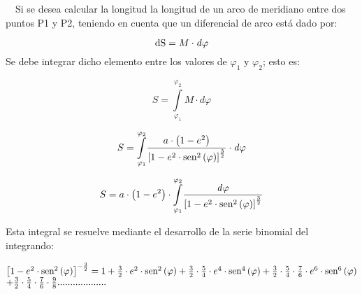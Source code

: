 \documentclass{tufte-book}
\newcommand\normalsubformula[1]{\text{\mathversion{normal}$#1$}}
\begin{document}
\ \ Si se desea calcular la longitud la longitud de un arco de meridiano
entre dos puntos P1 y P2, teniendo en cuenta que un diferencial de arco
está dado por:

\begin{equation*}
{\normalsubformula{\text{dS}}=M\cdot \mathit{d\varphi }}
\end{equation*}
Se debe integrar dicho elemento entre los valores de  ${\varphi _{{1}}}$
y  ${\varphi _{{2}}}$; esto es:

\begin{equation*}
{S=\overset{\varphi _{{2}}}{\underset{{\varphi _{{1}}}}{\int }}{M\cdot
\mathit{d\varphi }}}
\end{equation*}

\begin{equation*}
{S=\overset{\varphi _{{2}}}{\underset{{\varphi _{{1}}}}{\int}}{\frac{a\cdot \left(1-e^{{2}}\right)}{\left[1-e^{{2}}\cdot \normalsubformula{\text{sen}}^{{2}}\left(\varphi \right)\right]^{{\frac{3}{2}}}}\cdot \mathit{d\varphi }}}
\end{equation*}

\begin{equation*}
{S=a\cdot \left(1-e^{{2}}\right)\cdot \overset{\varphi _{{2}}}{\underset{{\varphi _{{1}}}}{\int }}{\frac{\mathit{d\varphi}}{\left[1-e^{{2}}\cdot \normalsubformula{\text{sen}}^{{2}}\left(\varphi \right)\right]^{{\frac{3}{2}}}}}}
\end{equation*}

Esta integral se resuelve mediante el desarrollo de la serie binomial
del integrando:

\begin{equation*}
\begin{matrix}{\left[1-e^{{2}}\cdot \normalsubformula{\text{sen}}^{{2}}\left(\varphi \right)\right]^{{-{\frac{3}{2}}}}=1+\frac{3}{2}\cdot e^{{2}}\cdot \normalsubformula{\text{sen}}^{{2}}\left(\varphi \right)+\frac{3}{2}\cdot {\frac{5}{4}}\cdot e^{{4}}\cdot \normalsubformula{\text{sen}}^{{4}}\left(\varphi \right)+\frac{3}{2}\cdot {\frac{5}{4}}\cdot {\frac{7}{6}}\cdot e^{{6}}\cdot \normalsubformula{\text{sen}}^{{6}}\left(\varphi \right)}\hfill\null \\+{\frac{3}{2}}\cdot {\frac{5}{4}}\cdot {\frac{7}{6}}\cdot {\frac{9}{8}}\text{.}\text{.}\text{.}\text{.}\text{.}\text{.}\text{.}\text{.}\text{.}\text{.}\text{.}\text{.}\text{.}\text{.}\text{.}\text{.}\text{.}\text{.}\text{.}\hfill\null \end{matrix}\hfill 
\end{equation*}
\end{document}
